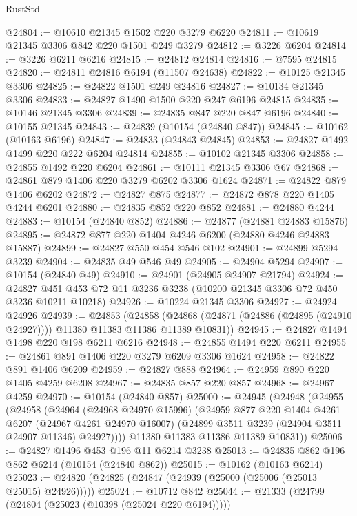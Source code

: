 \begin{lexlean}{RustStd}
\begin{coremodule}
@24804 := @10610 @21345 @1502 @220 @3279 @6220
@24811 := @10619 @21345 @3306 @842 @220 @1501 @249 @3279
@24812 := @3226 @6204
@24814 := @3226 @6211 @6216
@24815 := @24812 @24814
@24816 := @7595 @24815
@24820 := @24811 @24816 @6194 (@11507 @24638)
@24822 := @10125 @21345 @3306
@24825 := @24822 @1501 @249 @24816
@24827 := @10134 @21345 @3306
@24833 := @24827 @1490 @1500 @220 @247 @6196 @24815
@24835 := @10146 @21345 @3306
@24839 := @24835 @847 @220 @847 @6196
@24840 := @10155 @21345
@24843 := @24839 (@10154 (@24840 @847))
@24845 := @10162 (@10163 @6196)
@24847 := @24833 (@24843 @24845)
@24853 := @24827 @1492 @1499 @220 @222 @6204 @24814
@24855 := @10102 @21345 @3306
@24858 := @24855 @1492 @220 @6204
@24861 := @10111 @21345 @3306 @67
@24868 := @24861 @879 @1406 @220 @3279 @6202 @3306 @1624
@24871 := @24822 @879 @1406 @6202
@24872 := @24827 @875
@24877 := @24872 @878 @220 @1405 @4244 @6201
@24880 := @24835 @852 @220 @852
@24881 := @24880 @4244
@24883 := @10154 (@24840 @852)
@24886 := @24877 (@24881 @24883 @15876)
@24895 := @24872 @877 @220 @1404 @4246 @6200 (@24880 @4246 @24883 @15887)
@24899 := @24827 @550 @454 @546 @102
@24901 := @24899 @5294 @3239
@24904 := @24835 @49 @546 @49
@24905 := @24904 @5294
@24907 := @10154 (@24840 @49)
@24910 := @24901 (@24905 @24907 @21794)
@24924 := @24827 @451 @453 @72 @11 @3236 @3238 (@10200 @21345 @3306 @72 @450 @3236 @10211 @10218)
@24926 := @10224 @21345 @3306
@24927 := @24924 @24926
@24939 := @24853
    (@24858 (@24868 (@24871 (@24886 (@24895 (@24910 @24927)))) @11380 @11383 @11386 @11389 @10831))
@24945 := @24827 @1494 @1498 @220 @198 @6211 @6216
@24948 := @24855 @1494 @220 @6211
@24955 := @24861 @891 @1406 @220 @3279 @6209 @3306 @1624
@24958 := @24822 @891 @1406 @6209
@24959 := @24827 @888
@24964 := @24959 @890 @220 @1405 @4259 @6208
@24967 := @24835 @857 @220 @857
@24968 := @24967 @4259
@24970 := @10154 (@24840 @857)
@25000 := @24945
    (@24948
      (@24955
        (@24958
          (@24964
            (@24968 @24970 @15996)
            (@24959
              @877
              @220
              @1404
              @4261
              @6207
              (@24967 @4261 @24970 @16007)
              (@24899 @3511 @3239 (@24904 @3511 @24907 @11346) @24927))))
        @11380
        @11383
        @11386
        @11389
        @10831))
@25006 := @24827 @1496 @453 @196 @11 @6214 @3238
@25013 := @24835 @862 @196 @862 @6214 (@10154 (@24840 @862))
@25015 := @10162 (@10163 @6214)
@25023 := @24820 (@24825 (@24847 (@24939 (@25000 (@25006 (@25013 @25015) @24926)))))
@25024 := @10712 @842
@25044 := @21333
    (@24799 (@24804 (@25023 (@10398 (@25024 @220 @6194)))))

\end{coremodule}
\end{lexlean}
